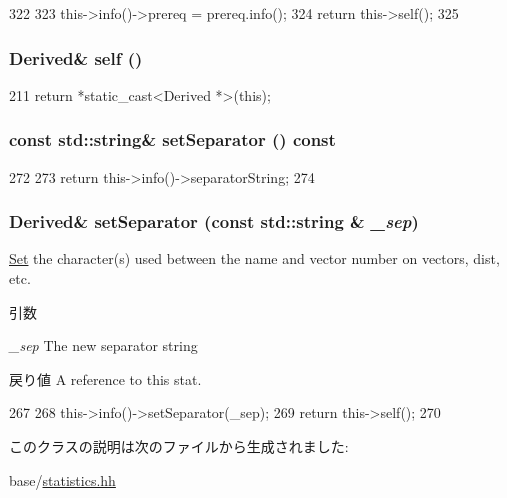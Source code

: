 \begin{DoxyCode}
322     {
323         this->info()->prereq = prereq.info();
324         return this->self();
325     }
\end{DoxyCode}
\hypertarget{classStats_1_1DataWrap_a334ee8b9534d94e8db50092240feaebd}{
\subsubsection[{self}]{\setlength{\rightskip}{0pt plus 5cm}Derived\& self ()}}
\label{classStats_1_1DataWrap_a334ee8b9534d94e8db50092240feaebd}



\begin{DoxyCode}
211 { return *static_cast<Derived *>(this); }
\end{DoxyCode}
\hypertarget{classStats_1_1DataWrap_a80da350fc3ba4b48698156c88a32a842}{
\subsubsection[{setSeparator}]{\setlength{\rightskip}{0pt plus 5cm}const std::string\& setSeparator () const}}
\label{classStats_1_1DataWrap_a80da350fc3ba4b48698156c88a32a842}



\begin{DoxyCode}
272     {
273       return this->info()->separatorString;
274     }
\end{DoxyCode}
\hypertarget{classStats_1_1DataWrap_a3ce5f6710b42a49a8b756760b90199be}{
\subsubsection[{setSeparator}]{\setlength{\rightskip}{0pt plus 5cm}Derived\& setSeparator (const std::string \& {\em \_\-sep})}}
\label{classStats_1_1DataWrap_a3ce5f6710b42a49a8b756760b90199be}
\hyperlink{classSet}{Set} the character(s) used between the name and vector number on vectors, dist, etc. 
\begin{DoxyParams}{引数}
\item[{\em \_\-sep}]The new separator string \end{DoxyParams}
\begin{DoxyReturn}{戻り値}
A reference to this stat. 
\end{DoxyReturn}



\begin{DoxyCode}
267     {
268       this->info()->setSeparator(_sep);
269       return this->self();
270     }
\end{DoxyCode}


このクラスの説明は次のファイルから生成されました:\begin{DoxyCompactItemize}
\item 
base/\hyperlink{statistics_8hh}{statistics.hh}\end{DoxyCompactItemize}
